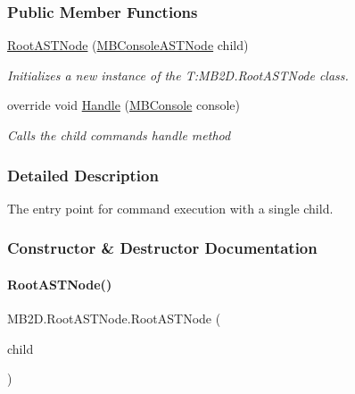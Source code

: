 \subsubsection*{Public Member Functions}
\begin{DoxyCompactItemize}
\item 
\hyperlink{class_m_b2_d_1_1_root_a_s_t_node_a95bcf5c31204ca61af984ddc58adff34}{Root\+A\+S\+T\+Node} (\hyperlink{class_m_b2_d_1_1_m_b_console_a_s_t_node}{M\+B\+Console\+A\+S\+T\+Node} child)
\begin{DoxyCompactList}\small\item\em Initializes a new instance of the T\+:\+M\+B2\+D.\+Root\+A\+S\+T\+Node class. \end{DoxyCompactList}\item 
override void \hyperlink{class_m_b2_d_1_1_root_a_s_t_node_a16290285c34db0660c0a8006fa182d0d}{Handle} (\hyperlink{class_m_b2_d_1_1_m_b_console}{M\+B\+Console} console)
\begin{DoxyCompactList}\small\item\em Calls the child commands handle method \end{DoxyCompactList}\end{DoxyCompactItemize}


\subsubsection{Detailed Description}
The entry point for command execution with a single child. 



\subsubsection{Constructor \& Destructor Documentation}
\hypertarget{class_m_b2_d_1_1_root_a_s_t_node_a95bcf5c31204ca61af984ddc58adff34}{}\label{class_m_b2_d_1_1_root_a_s_t_node_a95bcf5c31204ca61af984ddc58adff34} 
\paragraph{\texorpdfstring{Root\+A\+S\+T\+Node()}{RootASTNode()}}
{\footnotesize\ttfamily M\+B2\+D.\+Root\+A\+S\+T\+Node.\+Root\+A\+S\+T\+Node (\begin{DoxyParamCaption}\item[{\hyperlink{class_m_b2_d_1_1_m_b_console_a_s_t_node}{M\+B\+Console\+A\+S\+T\+Node}}]{child }\end{DoxyParamCaption})\hspace{0.3cm}{\ttfamily [inline]}}



